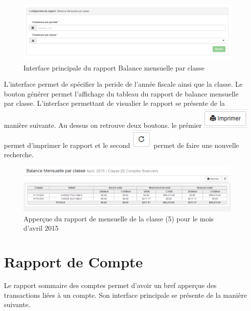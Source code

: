 \documentclass[12pt,a4paper]{report}
\begin{document}
\begin{figure}[h]
\begin{center}
\includegraphics[width=14cm]{pic/BalanceMensu.png}
\end{center}
\caption{Interface principale du rapport Balance mensuelle par classe}
\label{Interface principale du rapport Balance mensuelle par classe}
\end{figure}

L'interface permet de spécifier la peride de l'année fiscale ainsi que la classe. Le bouton générer permet l'affichage du tableau du rapport de balance mensuelle par classe.
L'interface permettant de visualier le rapport se présente de la manière suivante. Au dessus on retrouve deux boutons. le prémier 
\includegraphics[scale=0.7]{pic/Print.png} permet d'imprimer le rapport et le second \includegraphics[scale=0.7]{pic/refresh.png} permet de faire une nouvelle recherche.

\begin{figure}[h]
\begin{center}
\includegraphics[width=14cm]{pic/RappBalanceMen.png}
\end{center}
\caption{Apperçue du rapport de mensuelle de la classe (5) pour le mois d'avril 2015}
\label{Apperçue du rapport de mensuelle de la classe (5) pour le mois d'avril 2015}
\end{figure}


\newpage
\section{Rapport de Compte}
Le rapport sommaire des comptes permet d'avoir un bref apperçue des transactions liées à un compte. Son interface principale se présente de la manière suivante. 
\end{document}
